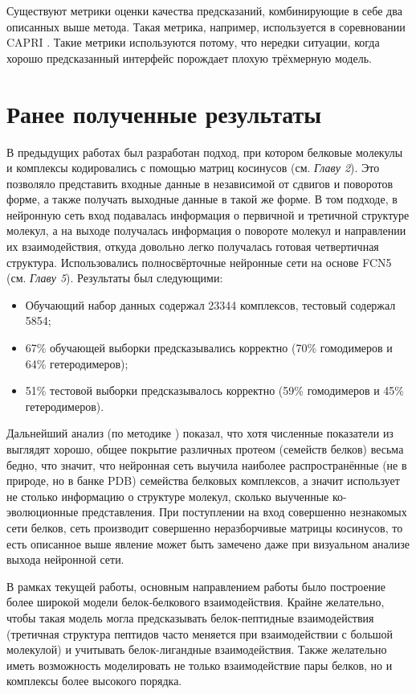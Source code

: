Существуют метрики оценки качества предсказаний, комбинирующие в себе два описанных выше метода. Такая метрика, например, используется в соревновании CAPRI \cite{basu}. Такие метрики используются потому, что нередки ситуации, когда хорошо предсказанный интерфейс порождает плохую трёхмерную модель.

\section{Ранее полученные результаты}
В предыдущих работах \cite{prip2023} был разработан подход, при котором белковые молекулы и комплексы кодировались с помощью матриц косинусов (см. \textit{Главу 2}). Это позволяло представить входные данные в независимой от сдвигов и поворотов форме, а также получать выходные данные в такой же форме. В том подходе, в нейронную сеть вход подавалась информация о первичной и третичной структуре молекул, а на выходе получалась информация о повороте молекул и направлении их взаимодействия, откуда довольно легко получалась готовая четвертичная структура. Использовались полносвёрточные нейронные сети на основе FCN5 (см. \textit{Главу 5}). Результаты был следующими:
\begin{itemize}
\item Обучающий набор данных содержал 23344 комплексов, тестовый содержал 5854;
\item 67\% обучающей выборки предсказывались корректно (70\% гомодимеров и 64\% гетеродимеров);
\item 51\% тестовой выборки предсказывалось корректно (59\% гомодимеров и 45\% гетеродимеров).
\end{itemize}

Дальнейший анализ (по методике \cite{zhu}) показал, что хотя численные показатели из \cite{prip2023} выглядят хорошо, общее покрытие различных протеом (семейств белков) весьма бедно, что значит, что нейронная сеть выучила наиболее распространённые (не в природе, но в банке PDB) семейства белковых комплексов, а значит использует не столько информацию о структуре молекул, сколько выученные ко-эволюционные представления. При поступлении на вход совершенно незнакомых сети белков, сеть производит совершенно неразборчивые матрицы косинусов, то есть описанное выше явление может быть замечено даже при визуальном анализе выхода нейронной сети.

В рамках текущей работы, основным направлением работы было построение более широкой модели белок-белкового взаимодействия. Крайне желательно, чтобы такая модель могла предсказывать белок-пептидные взаимодействия (третичная структура пептидов часто меняется при взаимодействии с большой молекулой) и учитывать белок-лигандные взаимодействия. Также желательно иметь возможность моделировать не только взаимодействие пары белков, но и комплексы более высокого порядка.






